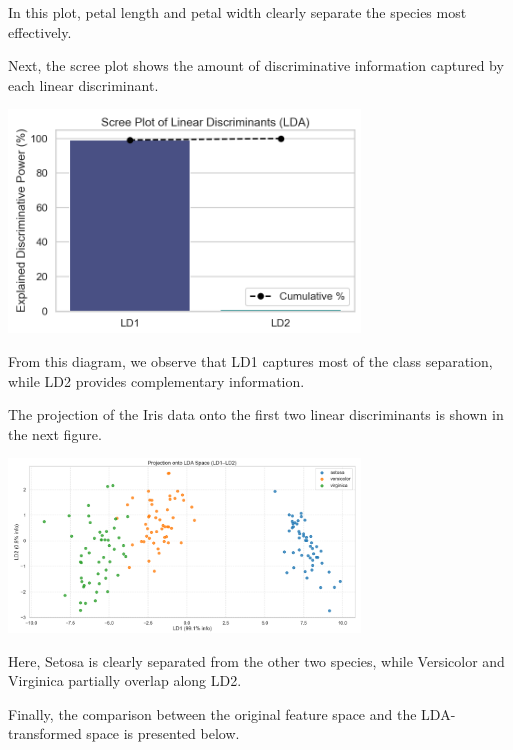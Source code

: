 \documentclass[12pt,a4paper]{article}
\begin{document}
In this plot, petal length and petal width clearly separate the species most effectively.

Next, the scree plot shows the amount of discriminative information captured by each linear discriminant.

\begin{center}
    \includegraphics[width=0.7\textwidth]{images/irish_scree_plot.png}
\end{center}

From this diagram, we observe that LD1 captures most of the class separation, while LD2 provides complementary information.

The projection of the Iris data onto the first two linear discriminants is shown in the next figure.

\begin{center}
    \includegraphics[width=0.7\textwidth]{images/irish_lda.png}
\end{center}

Here, Setosa is clearly separated from the other two species, while Versicolor and Virginica partially overlap along LD2.

Finally, the comparison between the original feature space and the LDA-transformed space is presented below.
\end{document}
